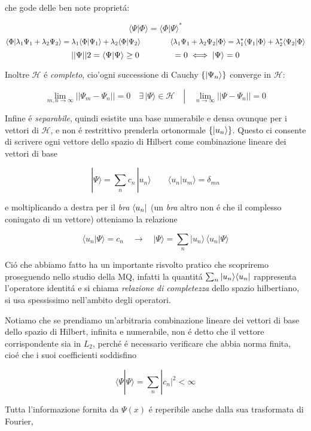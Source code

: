 che gode delle ben note propriet\'a:

$$\langle\Psi|\Phi\rangle=\langle\Phi|\Psi\rangle^{*}$$
$$\normalsize\langle \Phi \normalsize| \lambda_{1}\Psi_1 + \lambda_{2}\Psi_2 \normalsize\rangle = \lambda_{1}\normalsize\langle \Phi \normalsize| \Psi_{1} \normalsize\rangle + \lambda_{2}\normalsize\langle \Phi \normalsize| \Psi_{2} \normalsize\rangle \qquad\qquad 
\normalsize\langle \lambda_{1}\Psi_{1} + \lambda_{2}\Psi_{2} \normalsize| \Phi \normalsize\rangle = \lambda_{1}^* \normalsize\langle \Psi_{1} \normalsize| \Phi \normalsize\rangle + \lambda_{2}^* \normalsize\langle \Psi_{2} \normalsize| \Phi \normalsize\rangle$$
$$||\Psi||2 = \normalsize\langle \Psi \normalsize| \Psi \normalsize\rangle \geq 0 \qquad\qquad = 0 \iff \normalsize| \Psi \normalsize\rangle = 0$$

Inoltre $\mathcal{H}$ \'e \textit{completo}, cio'\e ogni successione di Cauchy $\{\normalsize| \Psi_n \normalsize\rangle\}$ converge in $\mathcal{H}$:

$$\operatorname*{lim}_{m,n\to\infty}||\Psi_{m}-\Psi_{n}||=0\quad\exists\,|\Psi\rangle\in{\mathcal{H}}\quad\left|\quad\operatorname*{lim}_{n\to\infty}||\Psi-\Psi_{n}||=0\right.$$

Infine \'e \textit{separabile}, quindi esistite una base numerabile e densa ovunque per i vettori di $\mathcal{H}$, e non \'e restrittivo prenderla ortonormale $\{\normalsize| u_n \normalsize\rangle\}$. Questo ci consente di scrivere ogni vettore dello spazio di Hilbert come combinazione lineare dei vettori di base

$$|\Psi\rangle=\sum_{n}c_{n}\,|u_{n}\rangle\qquad\langle u_{n}|u_{m}\rangle=\delta_{m n}$$

e moltiplicando a destra per il \textit{bra} $\normalsize\langle u_n \normalsize|$ (un \textit{bra} altro non \'e che il complesso coniugato di un vettore) otteniamo la relazione

$$\langle u_{n}|\Psi\rangle=c_{n}\quad\longrightarrow\quad|\Psi\rangle=\sum_{n}|u_{n}\rangle\,\langle u_{n}|\Psi\rangle$$

Ci\'o che abbiamo fatto ha un importante risvolto pratico che scopriremo proseguendo nello studio della MQ,
infatti la quantit\'a $\sum_n \normalsize| u_n \normalsize\rangle\normalsize\langle u_n \normalsize|$ rappresenta l'operatore identit\'a e si chiama \textit{relazione di completezza} dello spazio hilbertiano, si usa spessissimo nell'ambito degli operatori.

Notiamo che se prendiamo un'arbitraria combinazione lineare dei vettori di base dello spazio di Hilbert, infinita e numerabile, non \'e detto che il vettore corrispondente sia in $L_2$, perch\'e \'e necessario verificare che abbia norma finita, cio\'e che i suoi coefficienti soddisfino

$$\langle\Psi|\Psi\rangle=\sum_{n}|c_{n}|^{2}<\infty$$

Tutta l'informazione fornita da $\Psi(x)$ \'e reperibile anche dalla sua trasformata di Fourier, 

